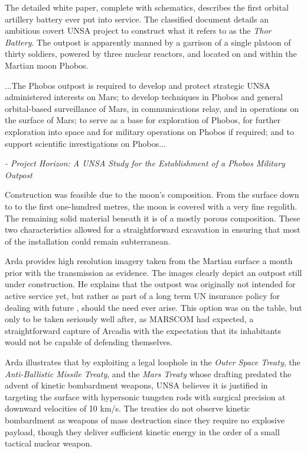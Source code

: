 The detailed white paper, complete with schematics, describes the first orbital artillery battery ever put into service. The classified document details an ambitious covert UNSA project to construct what it refers to as the {\it Thor Battery}. The outpost is apparently manned by a garrison of a single platoon of thirty soldiers, powered by three nuclear reactors, and located on and within the Martian moon Phobos. 

\startTimelineGeneralDocument
...The Phobos outpost is required to develop and protect strategic UNSA administered interests on Mars; to develop techniques in Phobos and general orbital-based surveillance of Mars, in communications relay, and in operations on the surface of Mars; to serve as a base for exploration of Phobos, for further exploration into space and for military operations on Phobos if required; and to support scientific investigations on Phobos...

\hskip 1.5cm {\it - Project Horizon: A UNSA Study for the Establishment of a Phobos Military Outpost}
\stopTimelineGeneralDocument

Construction was feasible due to the moon's composition. From the surface down to to the first one-hundred metres, the moon is covered with a very fine regolith. The remaining solid material beneath it is of a mostly porous composition. These two characteristics allowed for a straightforward excavation in ensuring that most of the installation could remain subterranean.

Arda provides high resolution imagery taken from the Martian surface a month prior with the transmission as evidence. The images clearly depict an outpost still under construction. He explains that the outpost was originally not intended for active service yet, but rather as part of a long term UN insurance policy for dealing with future , should the need ever arise. This option was on the table, but only to be taken seriously well after, as MARSCOM had expected, a straightforward capture of Arcadia with the expectation that its inhabitants would not be capable of defending themselves.

Arda illustrates that by exploiting a legal loophole in the {\it Outer Space Treaty}, the {\it Anti-Ballistic Missile Treaty}, and the {\it Mars Treaty} whose drafting predated the advent of kinetic bombardment weapons, UNSA believes it is justified in targeting the surface with hypersonic tungsten rods with surgical precision at downward velocities of 10 km/s. The treaties do not observe kinetic bombardment as weapons of mass destruction since they require no explosive payload, though they deliver sufficient kinetic energy in the order of a small tactical nuclear weapon.

